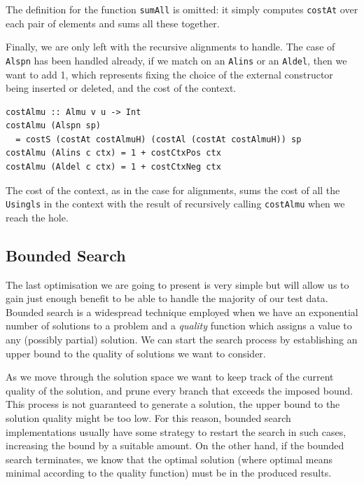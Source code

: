 \documentclass[11pt, titlepage]{article}
\newcommand{\toHaskell}[1]{\texttt{#1}\xspace}
\newcommand{\alins}{\toHaskell{Alins}}
\newcommand{\aldel}{\toHaskell{Aldel}}
\newcommand{\alspn}{\toHaskell{Alspn}}
\begin{document}
The definition for the function \toHaskell{sumAll} is omitted: it simply computes \toHaskell{costAt} over each pair of elements and sums all these together.

Finally, we are only left with the recursive alignments to handle. The case of \alspn has been handled already, if we match on an \alins or an \aldel, then we want to add 1, which represents fixing the choice of the external constructor being inserted or deleted, and the cost of the context.

\begin{verbatim}
costAlmu :: Almu v u -> Int
costAlmu (Alspn sp) 
  = costS (costAt costAlmuH) (costAl (costAt costAlmuH)) sp
costAlmu (Alins c ctx) = 1 + costCtxPos ctx
costAlmu (Aldel c ctx) = 1 + costCtxNeg ctx
\end{verbatim}

The cost of the context, as in the case for alignments, sums the cost of all the \toHaskell{Usingls} in the context with the result of recursively calling \toHaskell{costAlmu} when we reach the hole.


\subsection{Bounded Search}\label{bd-search}

The last optimisation we are going to present is very simple but will allow us to gain just enough benefit to be able to handle the majority of our test data. 
Bounded search is a widespread technique employed when we have an exponential number of solutions to a problem and a \emph{quality} function which assigns a value to any (possibly partial) solution. We can start the search process by establishing an upper bound to the quality of solutions we want to consider. 

As we move through the solution space we want to keep track of the current quality of the solution, and prune every branch that exceeds the imposed bound. 
This process is not guaranteed to generate a solution, the upper bound to the solution quality might be too low. For this reason, bounded search implementations usually have some strategy to restart the search in such cases, increasing the bound by a suitable amount. On the other hand, if the bounded search terminates, we know that the optimal solution (where optimal means minimal according to the quality function) must be in the produced results.
\end{document}

